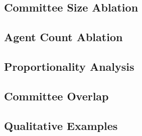\documentclass[sigconf]{aamas}
\begin{document}
\subsection{Committee Size Ablation}

\subsection{Agent Count Ablation}

\subsection{Proportionality Analysis}

\subsection{Committee Overlap}

\subsection{Qualitative Examples}
\end{document}
